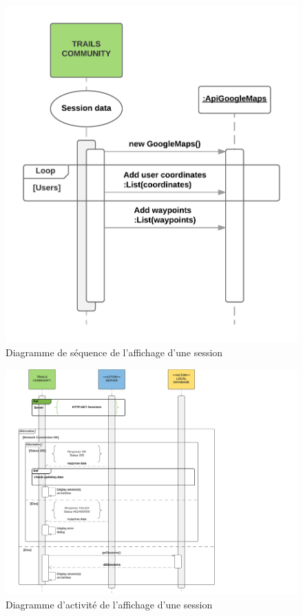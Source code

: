 \documentclass[titlepage, 12pt]{report}
\begin{document}

\begin{figure}[!h]
	\caption{Diagramme de séquence de l'affichage d'une session}
	\label{view_session_sequence_diagram}
	\centering
	\includegraphics[scale=0.7]{Images/diagram/view_session_sequence_diagram.png}
\end{figure}


\begin{figure}[!h]
	\caption{Diagramme d'activité de l'affichage d'une session}
	\label{view_session_activity_diagram}
	\centering
	\includegraphics[scale=0.2]{Images/diagram/view_session_activity_diagram.png}
\end{figure}
\end{document}
